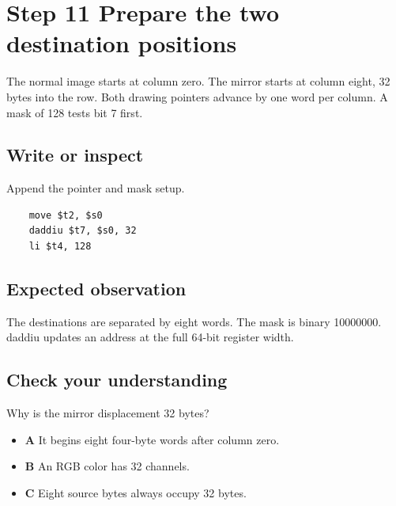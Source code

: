 \section{Step 11 Prepare the two destination
  positions}\label{003-eight-byte-sprite-s11-step-11-prepare-the-two-destination-positions}

The normal image starts at column zero. The mirror starts at column
eight, 32 bytes into the row. Both drawing pointers advance by one word
per column. A mask of 128 tests bit 7 first.

\subsection{Write or
  inspect}\label{003-eight-byte-sprite-s11-write-or-inspect}

Append the pointer and mask setup.

\begin{verbatim}
    move $t2, $s0
    daddiu $t7, $s0, 32
    li $t4, 128
\end{verbatim}

\subsection{Expected
  observation}\label{003-eight-byte-sprite-s11-expected-observation}

The destinations are separated by eight words. The mask is binary
10000000. daddiu updates an address at the full 64-bit register width.

\subsection{Check your
  understanding}\label{003-eight-byte-sprite-s11-check-your-understanding}

Why is the mirror displacement 32 bytes?

\begin{itemize}
  \tightlist
  \item
        \textbf{A} It begins eight four-byte words after column zero.
  \item
        \textbf{B} An RGB color has 32 channels.
  \item
        \textbf{C} Eight source bytes always occupy 32 bytes.
\end{itemize}
